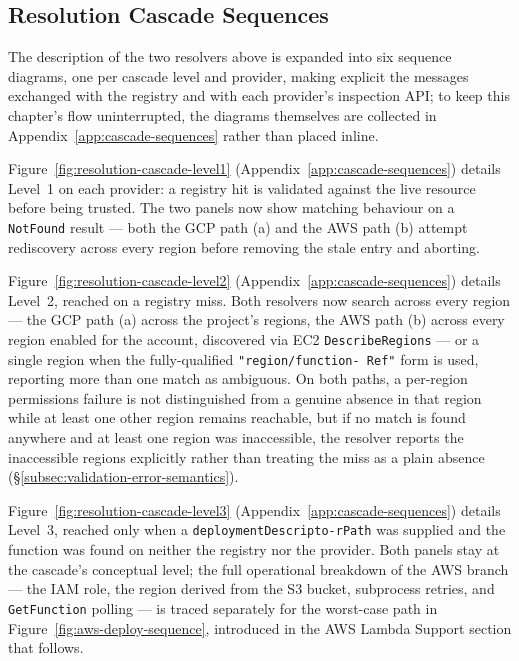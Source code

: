 \subsection{Resolution Cascade Sequences}
\label{subsec:cascade-sequences}

The description of the two resolvers above is expanded into six sequence diagrams, one per
cascade level and provider, making explicit the messages exchanged with the registry and with
each provider's inspection API; to keep this chapter's flow uninterrupted, the diagrams themselves
are collected in Appendix~\ref{app:cascade-sequences} rather than placed inline.

Figure~\ref{fig:resolution-cascade-level1} (Appendix~\ref{app:cascade-sequences}) details Level~1
on each provider: a registry hit is validated against the live resource before being trusted. The
two panels now show matching behaviour on a \texttt{NotFound} result --- both the GCP path (a) and
the AWS path (b) attempt rediscovery across every region before removing the stale entry and
aborting.

Figure~\ref{fig:resolution-cascade-level2} (Appendix~\ref{app:cascade-sequences}) details Level~2,
reached on a registry miss. Both resolvers now search across every region --- the GCP path (a)
across the project's regions, the AWS path (b) across every region enabled for the account,
discovered via EC2 \texttt{DescribeRegions} --- or a single region when the fully-qualified
\texttt{"region/function- Ref"} form is used, reporting more than one match as ambiguous. On both
paths, a per-region permissions failure is not distinguished from a genuine absence in that region
while at least one other region remains reachable, but if no match is found anywhere and at least
one region was inaccessible, the resolver reports the inaccessible regions explicitly rather than
treating the miss as a plain absence (\S\ref{subsec:validation-error-semantics}).

Figure~\ref{fig:resolution-cascade-level3} (Appendix~\ref{app:cascade-sequences}) details Level~3,
reached only when a \texttt{deployment\allowbreak Descripto-\allowbreak rPath} was supplied and the function was found on
neither the registry nor the provider. Both panels stay at the cascade's conceptual level; the
full operational breakdown of the AWS branch --- the IAM role, the region derived from the S3
bucket, subprocess retries, and \texttt{GetFunction} polling --- is traced separately for the
worst-case path in Figure~\ref{fig:aws-deploy-sequence}, introduced in the AWS Lambda Support
section that follows.

